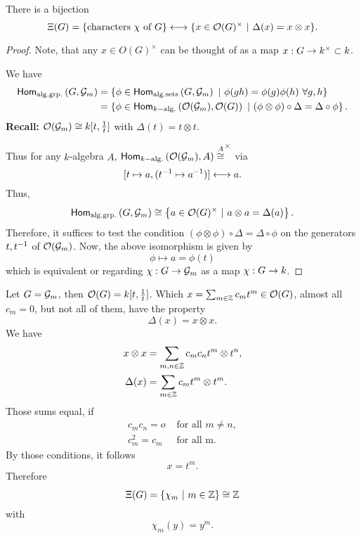 \begin{lemma}
	There is a bijection
	\[ \Xi(G) = \{ \text{characters } \chi \text{ of } G \} \longleftrightarrow \{ x \in \mathcal{O}(G)^\times ~|~ \Delta(x) = x \otimes x \}. \]
\end{lemma}
\begin{proof}
Note, that any $x \in O(G)^\times$ can be thought of as a map $x : G \overset{}{\rightarrow} k^\times \subset k$.

We have
\begin{align*}
\textsf{Hom}_{\mathrm{alg.grp.}}\left(G, \mathcal{G}_m\right) &= \left\lbrace\phi \in \textsf{Hom}_{\mathrm{alg.sets}}\left(G, \mathcal{G}_m\right) ~ | ~  \phi(gh) = \phi(g) \phi(h)~\forall g,h \right\rbrace\\
&= \left\lbrace\phi \in \textsf{Hom}_{k\mathrm{-alg.}}\left(\mathcal{O}(\mathcal{G}_m), \mathcal{O}(G)\right) ~ | ~ (\phi \otimes \phi) \circ \Delta = \Delta \circ \phi\right\rbrace.
\end{align*}
\textbf{Recall:} $\mathcal{O}(\mathcal{G}_m) \overset{}{\cong} k[t, \frac{1}{t}]$ with $\Delta(t) = t \otimes t$.

Thus for any $k$-algebra $A$, $\textsf{Hom}_{k\mathrm{-alg.}}\left(\mathcal{O}(\mathcal{G}_m), A\right) \overset{A}{\cong}^\times$ via
\[ [t \mapsto a, (t^{-1} \mapsto a^{-1})] \longleftrightarrow a. \]
Thus,
\begin{align*}
\textsf{Hom}_{\mathrm{alg.grp.}}\left(G, \mathcal{G}_m\right) \overset{}{\cong} \left\lbrace a \in \mathcal{O}(G)^\times ~ | ~  a \otimes a = \Delta(a) \right\rbrace.
\end{align*}
Therefore, it suffices to test the condition $ (\phi \otimes \phi ) \circ \Delta = \Delta \circ \phi $ on the generators $t,t^{-1}$ of $\mathcal{O}(\mathcal{G}_m)$.
Now, the above isomorphism is given by
\[ \phi \mapsto a = \phi(t) \]
which is equivalent or regarding $\chi : G \overset{}{\rightarrow} \mathcal{G}_m$ as a map $\chi : G \overset{}{\rightarrow} k$.
\end{proof}

\begin{example}
	Let $G = \mathcal{G}_m$, then $\mathcal{O}(G) = k[t, \frac{1}{t}]$. Which $x = \sum_{m \in \mathbb{Z}}c_mt^m \in \mathcal{O}(G)$, almost all $c_m = 0$, but not all of them, have the property
	\[ \Delta(x) = x\otimes x. \]
	We have
	\begin{align*}
	x \otimes x &= \sum_{m,n \in \mathbb{Z}} c_mc_n t^m \otimes t^n,\\
	\Delta(x) &= \sum_{m\in \mathbb{Z}} c_mt^m \otimes t^m.
	\end{align*}
	Those sums equal, if
	\begin{align*}
	c_mc_n = o & \text{ for all } m \neq n,\\
	c_m^2 = c_m & \text{ for all m}.
	\end{align*}
	By those conditions, it follows
	\[ x = t^m. \]
	Therefore
	\[ \Xi(G) = \left\lbrace\chi_m ~ | ~ m \in \mathbb{Z}\right\rbrace \overset{}{\cong} \mathbb{Z}\]
	with
	\[ \chi_m(y) = y^m. \]
\end{example}

